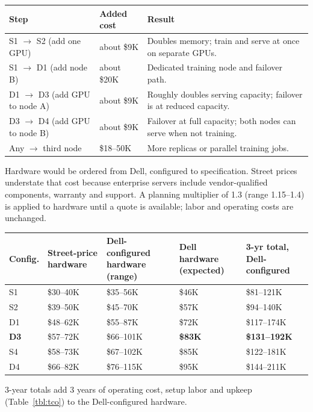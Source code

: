 {\small
\begin{tabularx}{\textwidth}{@{}Y{1.0}Y{0.6}Y{1.4}@{}}
  \toprule
  Step & Added cost & Result \\
  \midrule
  S1 $\to$ S2 (add one GPU) & about \$9K & Doubles memory; train and serve at once on separate GPUs. \\
  S1 $\to$ D1 (add node B) & about \$20K & Dedicated training node and failover path. \\
  D1 $\to$ D3 (add GPU to node A) & about \$9K & Roughly doubles serving capacity; failover is at reduced capacity. \\
  D3 $\to$ D4 (add GPU to node B) & about \$9K & Failover at full capacity; both nodes can serve when not training. \\
  Any $\to$ third node & \$18--50K & More replicas or parallel training jobs. \\
  \bottomrule
\end{tabularx}}


Hardware would be ordered from Dell, configured to specification. Street prices
understate that cost because enterprise servers include vendor-qualified components,
warranty and support. A planning multiplier of 1.3 (range 1.15--1.4) is applied to
hardware until a quote is available; labor and operating costs are unchanged.

{\footnotesize
\begin{xltabular}{\textwidth}{@{}l Y{0.848} Y{1.091} Y{0.848} Y{1.213}@{}}
  \toprule
  Config. & Street-price hardware & Dell-configured hardware (range) & Dell hardware (expected) & 3-yr total, Dell-configured \\
  \midrule
  \endhead
  S1 & \$30--40K & \$35--56K & \$46K & \$81--121K \\
  S2 & \$39--50K & \$45--70K & \$57K & \$94--140K \\
  D1 & \$48--62K & \$55--87K & \$72K & \$117--174K \\
  \textbf{D3} & \$57--72K & \$66--101K & \textbf{\$83K} & \textbf{\$131--192K} \\
  S4 & \$58--73K & \$67--102K & \$85K & \$122--181K \\
  D4 & \$66--82K & \$76--115K & \$95K & \$144--211K \\
  \bottomrule
\end{xltabular}}
{\footnotesize 3-year totals add 3 years of operating cost, setup labor and upkeep (Table~\ref{tbl:tco}) to the Dell-configured hardware.}

